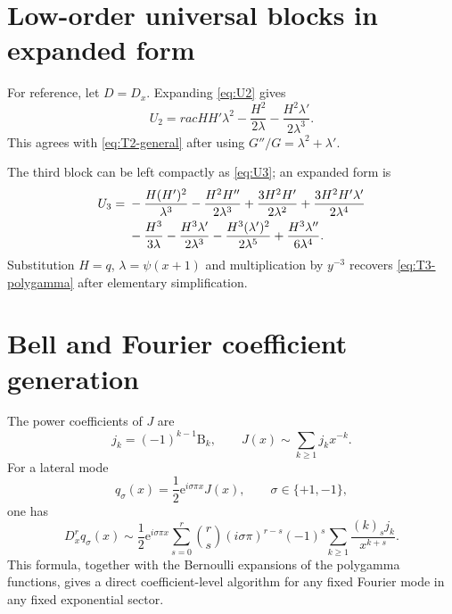 \documentclass[11pt,oneside]{article}
\theoremstyle{plain}
\theoremstyle{definition}
\theoremstyle{remark}
\newcommand{\ee}{\mathrm{e}}
\newcommand{\Bell}{\mathrm{B}}
\begin{document}
\section{Low-order universal blocks in expanded form}
\label{app:universal-blocks}

For reference, let \(D=D_x\).  Expanding \eqref{eq:U2} gives
\begin{equation}
 U_2=
rac{HH'}{\lambda^2}
 -\frac{H^2}{2\lambda}
 -\frac{H^2\lambda'}{2\lambda^3}.
 \label{eq:U2-expanded}
\end{equation}
This agrees with \eqref{eq:T2-general} after using
\(G''/G=\lambda^2+\lambda'\).

The third block can be left compactly as \eqref{eq:U3}; an expanded form is
\begin{align}
 U_3={}&-\frac{H(H')^2}{\lambda^3}
 -\frac{H^2H''}{2\lambda^3}
 +\frac{3H^2H'}{2\lambda^2}
 +\frac{3H^2H'\lambda'}{2\lambda^4}
 \notag\\
 &-\frac{H^3}{3\lambda}
 -\frac{H^3\lambda'}{2\lambda^3}
 -\frac{H^3(\lambda')^2}{2\lambda^5}
 +\frac{H^3\lambda''}{6\lambda^4}.
 \label{eq:U3-expanded}
\end{align}
Substitution \(H=q\), \(\lambda=\psi(x+1)\) and multiplication by \(y^{-3}\)
recovers \eqref{eq:T3-polygamma} after elementary simplification.

\section{Bell and Fourier coefficient generation}
\label{app:Bell-Fourier}

The power coefficients of \(J\) are
\begin{equation}
 j_k=(-1)^{k-1}\Bell_k,
 \qquad
 J(x)\sim\sum_{k\ge1}j_kx^{-k}.
 \label{eq:jk-def}
\end{equation}
For a lateral mode
\begin{equation}
 q_\sigma(x)=\frac12\ee^{i\sigma\pi x}J(x),
 \qquad \sigma\in\{+1,-1\},
 \label{eq:q-sigma}
\end{equation}
one has
\begin{equation}
 D_x^r q_\sigma(x)
 \sim\frac12\ee^{i\sigma\pi x}
 \sum_{s=0}^{r}\binom{r}{s}(i\sigma\pi)^{r-s}
 (-1)^s\sum_{k\ge1}
 \frac{(k)_s j_k}{x^{k+s}}.
 \label{eq:q-sigma-derivatives}
\end{equation}
This formula, together with the Bernoulli expansions of the polygamma
functions, gives a direct coefficient-level algorithm for any fixed Fourier
mode in any fixed exponential sector.
\end{document}

